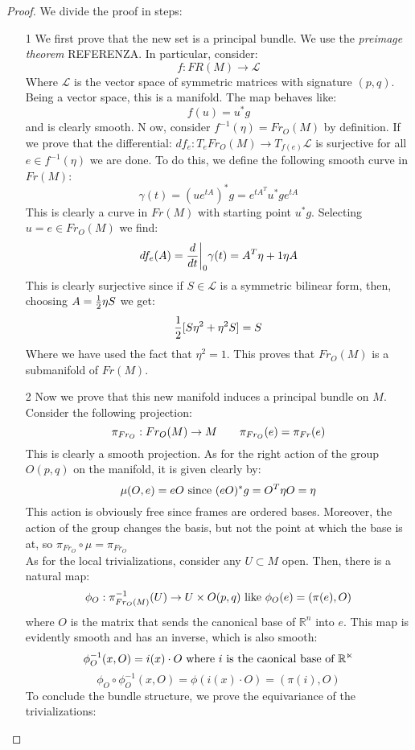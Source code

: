 \documentclass[12pt,a4paper]{report}
\theoremstyle{definition}
\theoremstyle{Theorem}
\theoremstyle{definition}
\theoremstyle{definition}
\begin{document}
		\begin{proof}
			We divide the proof in steps:
			\begin{itemize}
				\item [1] We first prove that the new set is a principal bundle. We use the \textit{preimage theorem} REFERENZA. In particular, consider:
				$$f:FR(M)\rightarrow \mathcal{L}$$
				Where $\mathcal{L}$ is the vector space of symmetric matrices with signature $(p,q)$. Being a vector space, this is a manifold. The map behaves like:
				$$f(u)=u^*g$$
				and is clearly smooth. N
				ow, consider $f^{-1}(\eta)=Fr_O(M)$ by definition. If we prove that the differential:
				$df_e:T_eFr_O(M)\rightarrow T_{f(e)}\mathcal{L}$ is surjective for all $e\in f^{-1}(\eta)$ we are done.
				To do this, we define the following smooth curve in $Fr(M)$:
				$$\gamma(t)=(ue^{tA})^*g=e^{tA^T}u^*ge^{tA}$$
				This is clearly a curve in $Fr(M)$ with starting point $u^*g$. Selecting $u=e\in Fr_O(M)$ we find:
				$$df_e(A)={d\over dt}\bigg|_0 \gamma(t)=A^T\eta+1\eta A$$
				This is clearly surjective since if $S\in\mathcal{L}$ is a symmetric bilinear form, then, choosing $A={1\over 2}\eta S$ we get:
				$${1\over 2}[S\eta^2+\eta^2S]=S$$
				Where we have used the fact that $\eta^2=1$. This proves that $Fr_O(M)$ is a submanifold of $Fr(M)$.
				\item [2] Now we prove that this new manifold induces a principal bundle on $M$. Consider the following projection:
				$$\pi_{Fr_O}:Fr_O(M)\rightarrow M\hspace{20 pt}\pi_{Fr_O}(e)=\pi_{Fr}(e)$$
				This is clearly a smooth projection. As for the right action of the group $O(p,q)$ on the manifold, it is given clearly by:
				$$\mu(O,e)=eO\hbox{ since }(eO)^*g=O^T\eta O=\eta$$
				This action is obviously free since frames are ordered bases. Moreover, the action of the group changes the basis, but not the point at which the base is at, so $\pi_{Fr_O}\circ \mu=\pi_{Fr_O}$\\
				As for the local trivializations, consider any $U\subset M$ open. Then, there is a natural map:
				$$\phi_O:\pi_{Fr_O(M)}^{-1}(U)\rightarrow U\times O(p,q) \hbox{ like }\phi_O(e)=(\pi(e),O)$$
				where $O$ is the matrix that sends the canonical base of $\mathbb{R}^n$ into $e$. This map is evidently smooth and has an inverse, which is also smooth:
				$$\phi_O^{-1}(x,O)=i(x)\cdot O\hbox{ where } i \hbox{ is the caonical base of }\mathbb{R^n}$$
				$$\phi_O\circ \phi_O^{-1}(x,O)=\phi(i(x)\cdot O)=(\pi(i),O)$$
				To conclude the bundle structure, we prove the equivariance of the trivializations:

\end{itemize}
\end{proof}
\end{document}
